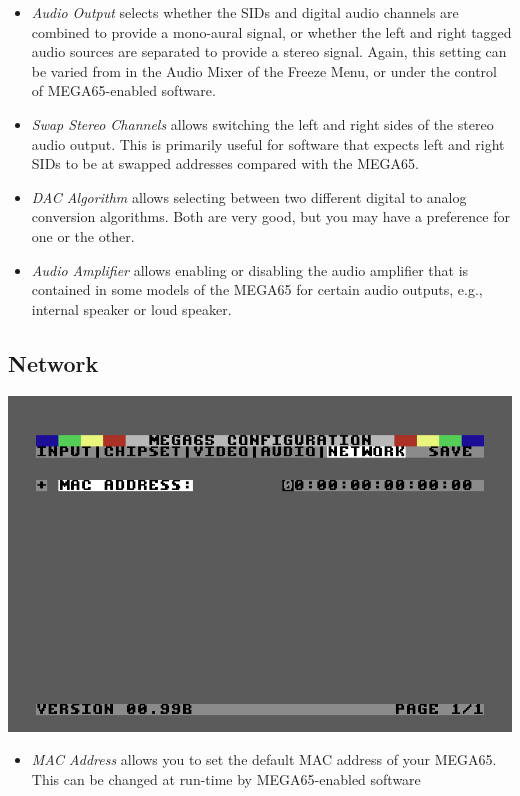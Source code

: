 \begin{itemize}
  \item{\em Audio Output} selects whether the SIDs and digital audio
    channels are combined to provide a mono-aural signal, or whether
    the left and right tagged audio sources are separated to provide a
    stereo signal. Again, this setting can be varied from in the Audio
    Mixer of the Freeze Menu, or under the control of MEGA65-enabled
    software.
  \item{\em Swap Stereo Channels} allows switching the left and right
    sides of the stereo audio output. This is primarily useful for
    software that expects left and right SIDs to be at swapped
    addresses compared with the MEGA65.
  \item{\em DAC Algorithm} allows selecting between two different
    digital to analog conversion algorithms.  Both are very good,
    but you may have a preference for one or the other.
  \item{\em Audio Amplifier} allows enabling or disabling the audio
    amplifier that is contained in some models of the MEGA65 for
    certain audio outputs, e.g., internal speaker or loud speaker.
\end{itemize}

\subsection{Network}

\includegraphics[width=\linewidth]{images/ss-m65config-5.png}

\begin{itemize}
  \item{\em MAC Address} allows you to set the default MAC address of your
    MEGA65.  This can be changed at run-time by MEGA65-enabled
    software
\end{itemize}
